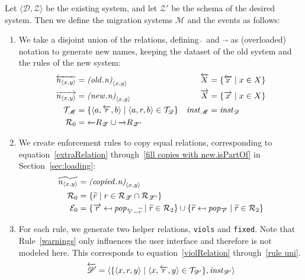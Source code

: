 \documentclass[runningheads]{llncs}
\newcommand{\id}[1]{\text{\it #1\/}}
\newcommand{\popF}[1]{\id{pop}_{#1}}
\newcommand{\instance}{\mathbin{\id{inst}}}
\newcommand{\declare}[3]{\id{#1}_{\pair{#2}{#3}}}
\newcommand{\pair}[2]{\langle{#1},{#2}\rangle}
\newcommand{\triple}[3]{\langle{#1},{#2},{#3}\rangle}
\newcommand{\rels}{\mathcal{R}}   %
\newcommand{\triples}{\mathcal{T}}
\newcommand{\enforces}{\mathcal{E}}
\newcommand{\rules}{\mathcal{U}}
\newcommand{\dataset}{\mathscr{D}}
\newcommand{\schema}{\mathscr{Z}}
\newcommand{\migrsys}{\mathscr{M}}
\begin{document}
   Let $\pair{\dataset}{\schema}$ be the existing system, and let ${\schema'}$ be the schema of the desired system.
   Then we define the migration systems $\migrsys$ and the events as follows:
\begin{enumerate}
\item We take a disjoint union of the relations, defining $\overleftarrow~$ and $\overrightarrow~$ as (overloaded) notation to generate new names, keeping the dataset of the old system and the rules of the new system:
   \begin{align}
   \overleftarrow{\declare{n}{x}{y}}&=\declare{(\id{old}.n)}{x}{y}&\overleftarrow{X} &= \{\overleftarrow{x}\mid x\in X\}\\
   \overrightarrow{\declare{n}{x}{y}}&=\declare{(\id{new}.n)}{x}{y}& \overrightarrow{X} &= \{\overrightarrow{x}\mid x\in X\}\\
   \triples_\migrsys &= \{\triple{a}{\overleftarrow{r}}{b} \mid \triple{a}{r}{b}\in\triples_\dataset\}&
   \instance_\migrsys &= \instance_\dataset\\
   \rels_\theenumi &= \overleftarrow\rels_{\schema} \cup \overrightarrow\rels_{\schema'}
   \end{align}
\item We create enforcement rules to copy equal relations, corresponding to equation~\ref{extraRelation} through~\ref{fill copies with new.isPartOf} in Section~\ref{sec:loading}:
   \begin{align}
   \widetilde{\declare{n}{x}{y}} &= \declare{(\id{copied}.n)}{x}{y}\\
   \rels_\theenumi &= \{\widetilde{r}\mid r \in \rels_\schema \cap \rels_{\schema'}\}\\
   \enforces_\theenumi &= \{\overrightarrow{r}\mapsfrom \popF{\overleftarrow{r} - \widetilde{r}} \mid \widetilde{r} \in \rels_2\} \cup \{\widetilde{r}\mapsfrom \popF{\overrightarrow{r}} \mid \widetilde{r} \in \rels_2\}
   \end{align}
\item For each rule, we generate two helper relations, {\tt viols} and {\tt fixed}. Note that Rule~\ref{warnings} only influences the user interface and therefore is not modeled here. This corresponds to equation~\ref{violRelation} through~\ref{rule uni}.
   \begin{align}
   \overleftarrow{\dataset'} &= \pair{\{\triple{x}{{r}}{y}\mid \triple{x}{\overleftarrow{r}}{y} \in \triples_{\dataset'}\}}{\instance_{\dataset'}}\\

\end{align}
\end{enumerate}
\end{document}
